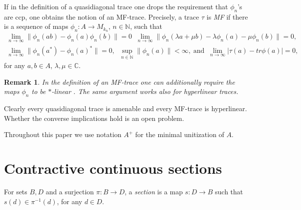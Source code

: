 \documentclass{article}%
\newtheorem{remark}[theorem]{Remark}
\begin{document}
If in the definition of a quasidiagonal trace one drops the requirement that $\phi_n$'s are ccp, one obtains the notion of an MF-trace. Precisely,
a trace $\tau$ is {\it MF} if there is a sequence of  maps $\phi_n: A \to M_{k_n}$, $n\in \mathbb N$, such that
\begin{multline*}  \lim_{n\to \infty} \|\phi_n(ab)- \phi_n(a)\phi_n(b)\|=0 \;\; \lim_{n\to \infty}\|\phi_n(\lambda a+\mu b)- \lambda\phi_n(a)-\mu \phi_n(b)\| =0, \\ \lim_{n\to \infty} \|\phi_n(a^*) - \phi_n(a)^*\|=0,\;\; \sup_{n\in \mathbb N} \|\phi_n(a)\|<\infty, \; \text{and} \;\; \lim_{n\to \infty}|\tau(a)- tr \phi(a)|=0,\end{multline*} for any $a, b\in A$, $\lambda, \mu\in \mathbb C$.


\begin{remark} In the definition of an MF-trace  one can additionally require the maps $\phi_n$ to be $\ast$-linear   \cite[Prop. 2.2]{RainoneSch}. The same argument  works also for  hyperlinear traces.
\end{remark}

Clearly every quasidiagonal trace is amenable and every MF-trace is hyperlinear. Whether the converse implications hold is an open problem.







\medskip

Throughout this paper we use notation $A^+$  for the minimal unitization of $A$.

\section{Contractive continuous sections}



For sets $B, D$ and a surjection $\pi: B \to D$, a {\it section} is a map $s: D\to B$ such that $s(d)\in \pi^{-1}(d)$, for any $d\in D$.
\end{document}
